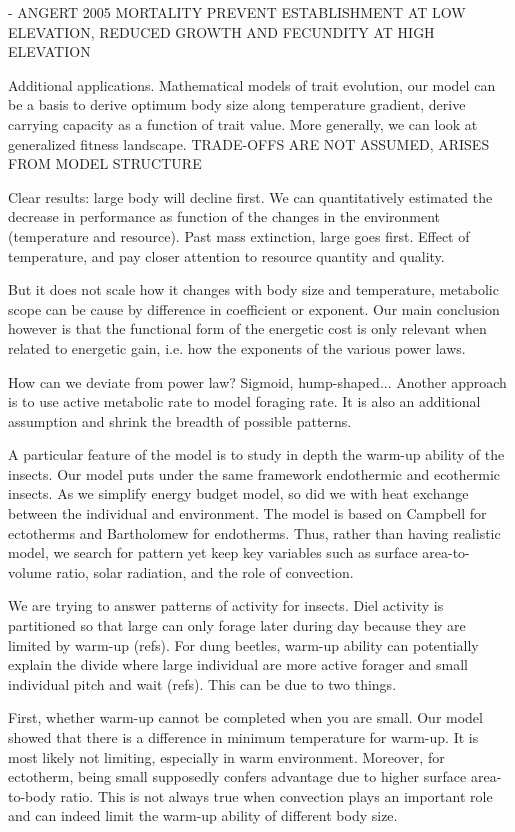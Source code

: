  - 
ANGERT 2005 MORTALITY PREVENT ESTABLISHMENT AT LOW ELEVATION, REDUCED GROWTH AND FECUNDITY AT HIGH ELEVATION

Additional applications.
Mathematical models of trait evolution, our model can be a basis to derive optimum body size along temperature gradient, derive carrying capacity as a function of trait value. 
More generally, we can look at generalized fitness landscape.
TRADE-OFFS ARE NOT ASSUMED, ARISES FROM MODEL STRUCTURE

Clear results: large body will decline first. 
We can quantitatively estimated the decrease in performance as function of the changes in the environment  (temperature and resource).
Past mass extinction, large goes first.
Effect of temperature, and pay closer attention to resource quantity and quality.

But it does not scale how it changes with body size and temperature, metabolic scope can be cause by difference in coefficient or exponent.
Our main conclusion however is that the functional form of the energetic cost is only relevant when related to energetic gain, i.e. how the exponents of the various power laws.  

How can we deviate from power law? 
Sigmoid, hump-shaped...
Another approach is to use active metabolic rate to model foraging rate.
It is also an additional assumption and shrink the breadth of possible patterns.

A particular feature of the model is to study in depth the warm-up ability of the insects.
Our model puts under the same framework endothermic and ecothermic insects.
As we simplify energy budget model, so did we with heat exchange between the individual and environment.
The model is based on Campbell for ectotherms and Bartholomew for endotherms.
Thus, rather than having realistic model, we search for pattern yet keep key variables such as surface area-to-volume ratio, solar radiation, and the role of convection.

We are trying to answer patterns of activity for insects.
Diel activity is partitioned so that large can only forage later during day because they are limited by warm-up (refs).
For dung beetles, warm-up ability can potentially explain the divide where large individual are more active forager and small individual pitch and wait (refs).
This can be due to two things.

First, whether warm-up cannot be completed when you are small.
Our model showed that there is a difference in minimum temperature for warm-up. 
It is most likely not limiting, especially in warm environment.
Moreover, for ectotherm, being small supposedly confers advantage due to higher surface area-to-body ratio. 
This is not always true when convection plays an important role and can indeed limit the warm-up ability of different body size.

